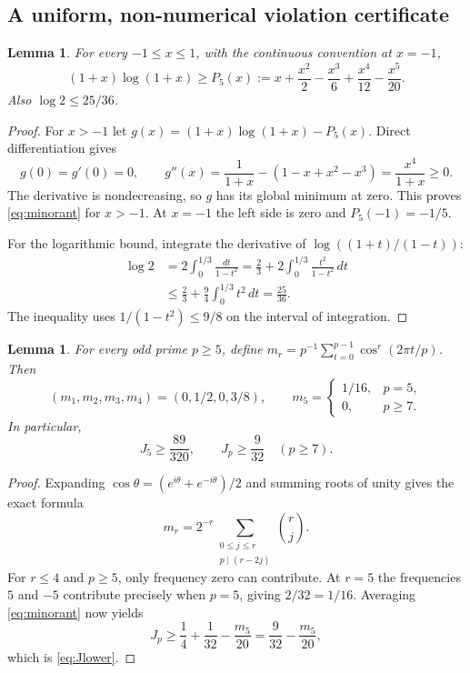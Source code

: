 \documentclass[11pt]{article}
\newtheorem{lemma}[theorem]{Lemma}
\theoremstyle{remark}
\begin{document}
\subsection{A uniform, non-numerical violation certificate}
\begin{lemma}\label{lem:minorant}
For every $-1\leq x\leq1$, with the continuous convention at $x=-1$,
\begin{equation}\label{eq:minorant}
 (1+x)\log(1+x)\geq
 P_5(x):=x+\frac{x^2}{2}-\frac{x^3}{6}+\frac{x^4}{12}-\frac{x^5}{20}.
\end{equation}
Also $\log2\leq25/36$.
\end{lemma}
\begin{proof}
For $x>-1$ let $g(x)=(1+x)\log(1+x)-P_5(x)$. Direct differentiation gives
\[
 g(0)=g'(0)=0,\qquad
 g''(x)=\frac1{1+x}-(1-x+x^2-x^3)=\frac{x^4}{1+x}\geq0.
\]
The derivative is nondecreasing, so $g$ has its global minimum at zero. This proves \eqref{eq:minorant} for $x>-1$. At $x=-1$ the left side is zero and $P_5(-1)=-1/5$.

For the logarithmic bound, integrate the derivative of $\log((1+t)/(1-t))$:
\begin{align*}
 \log2
 &=2\int_0^{1/3}\frac{dt}{1-t^2}
 =\frac23+2\int_0^{1/3}\frac{t^2}{1-t^2}\,dt\\
 &\leq\frac23+\frac94\int_0^{1/3}t^2\,dt
 =\frac{25}{36}.
\end{align*}
The inequality uses $1/(1-t^2)\leq9/8$ on the interval of integration.
\end{proof}

\begin{lemma}\label{lem:moments}
For every odd prime $p\geq5$, define $m_r=p^{-1}\sum_{t=0}^{p-1}\cos^r(2\pi t/p)$. Then
\[
 (m_1,m_2,m_3,m_4)=(0,1/2,0,3/8),\qquad
 m_5=\begin{cases}1/16,&p=5,\\0,&p\geq7.\end{cases}
\]
In particular,
\begin{equation}\label{eq:Jlower}
 J_5\geq\frac{89}{320},\qquad J_p\geq\frac9{32}\quad(p\geq7).
\end{equation}
\end{lemma}
\begin{proof}
Expanding $\cos\theta=(e^{i\theta}+e^{-i\theta})/2$ and summing roots of unity gives the exact formula
\[
 m_r=2^{-r}\sum_{\substack{0\leq j\leq r\\p\mid(r-2j)}}\binom rj.
\]
For $r\leq4$ and $p\geq5$, only frequency zero can contribute. At $r=5$ the frequencies $5$ and $-5$ contribute precisely when $p=5$, giving $2/32=1/16$. Averaging \eqref{eq:minorant} now yields
\[
 J_p\geq\frac14+\frac1{32}-\frac{m_5}{20}
 =\frac9{32}-\frac{m_5}{20},
\]
which is \eqref{eq:Jlower}.
\end{proof}
\end{document}
